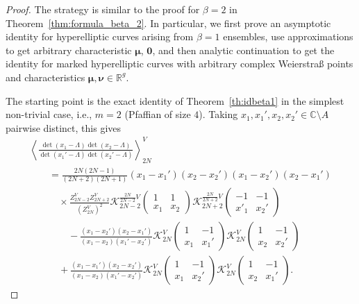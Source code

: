 \documentclass[10pt,a4paper]{amsart}
\numberwithin{equation}{section}
\newcommand{\mean}[1]{\left\langle{#1}\right\rangle}
\begin{document}
\begin{proof}
 The strategy is similar to the proof for $\beta = 2$ in Theorem~\ref{thm:formula_beta_2}. In particular, we first prove an asymptotic identity for hyperelliptic curves arising from $\beta = 1$ ensembles, use approximations to get arbitrary characteristic $\bm{\mu}$, $\bm{0}$, and then analytic continuation to get the identity for marked hyperelliptic curves with arbitrary complex Weierstra\ss{} points and characteristics $\bm{\mu},\bm{\nu} \in \mathbb{R}^g$.

The starting point is the exact identity of Theorem~\ref{th:idbeta1} in the simplest
 non-trivial case, i.e., $m = 2$ (Pfaffian of size $4$). Taking $x_1,x_1',x_2,x_2' \in \mathbb{C} \setminus A$ pairwise distinct, this gives
 \begin{gather}
	  \mean{\frac{\det(x_1- \Lambda)\det(x_2- \Lambda)}{\det(x_1'- \Lambda)\det(x_2'- \Lambda)}}_{2N}^{V} \nonumber\\
	\qquad {}  = \frac{2N(2N - 1)}{(2N + 2)(2N + 1)} (x_1- x_1')(x_2- x_2')(x_1- x_2')(x_2- x_1') \nonumber\\
\qquad \quad{}\times\frac{Z_{2N - 2}^{V}Z_{2N + 2}^{V}}{(Z_{2N}^{V})^2} \mathcal{K}_{2N - 2}^{\frac{2N}{2N - 2}V}\left(\begin{matrix} 1 & 1 \\ x_1& x_2\end{matrix}\right)\mathcal{K}_{2N + 2}^{\frac{2N}{2N + 2}V}\left(\begin{matrix} -1 & -1 \\ x'_1& x_2'\end{matrix}\right) \nonumber\\
\qquad\qquad{}	 - \frac{(x_1- x_2')(x_2- x_1')}{(x_1- x_2)(x_1'- x_2')} \mathcal{K}_{2N}^V\left(\begin{matrix} 1 & -1 \\ x_1& x_1'\end{matrix}\right)\mathcal{K}_{2N}^{V}\left(\begin{matrix} 1 & -1 \\ x_2& x_2'\end{matrix}\right) \nonumber\\
\qquad\quad{}+ \frac{(x_1- x_1')(x_2- x_2')}{(x_1- x_2)(x_1'- x_2')}\mathcal{K}_{2N}^{V}\left(\begin{matrix} 1 & -1 \\ x_1& x_2'\end{matrix}\right)\mathcal{K}_{2N}^{V}\left(\begin{matrix} 1 & -1 \\ x_2& x_1'\end{matrix}\right). \label{beta1un}

\end{gather}
\end{proof}
\end{document}
